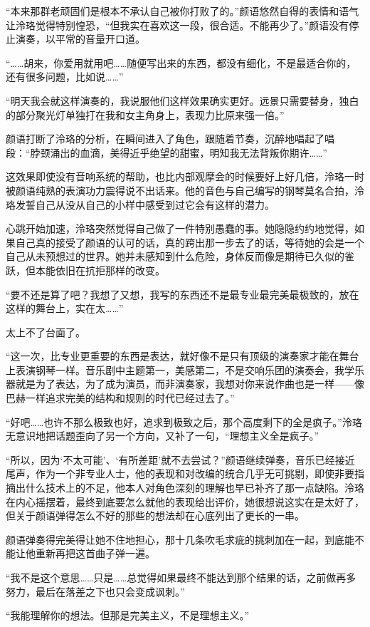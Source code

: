 \documentclass[UTF8, scheme = chinese, openany]{ctexbook}
\begin{document}
“本来那群老顽固们是根本不承认自己被你打败了的。”颜语悠然自得的表情和语气让泠珞觉得特别惶恐，“但我实在喜欢这一段，很合适。不能再少了。”颜语没有停止演奏，以平常的音量开口道。

“……胡来，你爱用就用吧……随便写出来的东西，都没有细化，不是最适合你的，还有很多问题，比如说……”

“明天我会就这样演奏的，我说服他们这样效果确实更好。远景只需要替身，独白的部分聚光灯单独打在我和女主角身上，表现力比原来强一倍。”

颜语打断了泠珞的分析，在瞬间进入了角色，跟随着节奏，沉醉地唱起了唱段：“脖颈涌出的血滴，美得近乎绝望的甜蜜，明知我无法背叛你期许……”

这效果即使没有音响系统的帮助，也比内部观摩会的时候要好上好几倍，泠珞一时被颜语纯熟的表演功力震得说不出话来。他的音色与自己编写的钢琴莫名合拍，泠珞发誓自己从没从自己的小样中感受到过它会有这样的潜力。

心跳开始加速，泠珞突然觉得自己做了一件特别愚蠢的事。她隐隐约约地觉得，如果自己真的接受了颜语的认可的话，真的跨出那一步去了的话，等待她的会是一个自己从未预想过的世界。她并未感知到什么危险，身体反而像是期待已久似的雀跃，但本能依旧在抗拒那样的改变。

“要不还是算了吧？我想了又想，我写的东西还不是最专业最完美最极致的，放在这样的舞台上，实在太……”

太上不了台面了。

“这一次，比专业更重要的东西是表达，就好像不是只有顶级的演奏家才能在舞台上表演钢琴一样。音乐剧中主题第一，美感第二，不是交响乐团的演奏会，我学乐器就是为了表达，为了成为演员，而非演奏家，我想对你来说作曲也是一样——像巴赫一样追求完美的结构和规则的时代已经过去了。”

“好吧……也许不那么极致也好，追求到极致之后，那个高度剩下的全是疯子。”泠珞无意识地把话题歪向了另一个方向，又补了一句，“理想主义全是疯子。”

“所以，因为‘不太可能’、‘有所差距’就不去尝试？”颜语继续弹奏，音乐已经接近尾声，作为一个非专业人士，他的表现和对改编的统合几乎无可挑剔，即使非要指摘出什么技术上的不足，他本人对角色深刻的理解也早已补齐了那一点缺陷。泠珞在内心摇摆着，最终到底要怎么就他的表现给出评价，她很想说这实在是太好了，但关于颜语弹得怎么不好的那些的想法却在心底列出了更长的一串。

颜语弹奏得完美得让她不住地担心，那十几条吹毛求疵的挑刺加在一起，到底能不能让他重新再把这首曲子弹一遍。

“我不是这个意思……只是……总觉得如果最终不能达到那个结果的话，之前做再多努力，最后在落差之下也只会变成讽刺。”

“我能理解你的想法。但那是完美主义，不是理想主义。”
\end{document}
